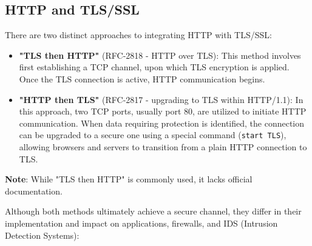 \subsection{HTTP and TLS/SSL}

There are two distinct approaches to integrating HTTP with TLS/SSL:
\begin{itemize}
    \item \textbf{"TLS then HTTP"} (RFC-2818 - HTTP over TLS): This method involves first establishing a TCP channel, upon which TLS encryption is applied. Once the TLS connection is active, HTTP communication begins.

    \item \textbf{"HTTP then TLS"} (RFC-2817 - upgrading to TLS within HTTP/1.1): In this approach, two TCP ports, usually port 80, are utilized to initiate HTTP communication. When data requiring protection is identified, the connection can be upgraded to a secure one using a special command (\texttt{start TLS}), allowing browsers and servers to transition from a plain HTTP connection to TLS.
\end{itemize}
\textbf{Note}: While "TLS then HTTP" is commonly used, it lacks official documentation.


Although both methods ultimately achieve a secure channel, they differ in their implementation and impact on applications, firewalls, and IDS (Intrusion Detection Systems):

